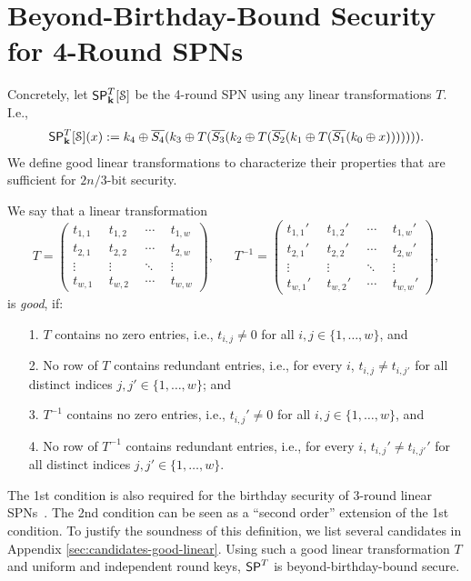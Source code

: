 
\section{Beyond-Birthday-Bound Security for 4-Round SPNs}
\label{section:security of 4-round SPNs}

Concretely, let $\mathsf{SP}_{\mathbf{k}}^T[\mathcal{S}]$ be the 4-round SPN using any linear transformations $T$. I.e.,
%
\begin{align}
\mathsf{SP}_{\mathbf{k}}^T[\mathcal{S}](x):=k_4\oplus\overline{S_4}(k_3\oplus T(\overline{S_3}(k_2\oplus T(\overline{S_2}(k_1\oplus T(\overline{S_1}(k_0\oplus x))))))).
\label{eq:defn-4-round-spn}
\end{align}
%
We define good linear transformations to characterize their properties that are sufficient for $2n/3$-bit security.


\begin{definition}
	\label{defn:good-T}
	
	We say that a linear transformation
	\[
	T=
	\left(
	\begin{array}{cccc}
	t_{1,1}~ & ~t_{1,2}~ & ~\cdots~ & ~t_{1,w}  \\
	t_{2,1}~ & ~t_{2,2}~ & ~\cdots~ & ~t_{2,w}  \\
	\vdots~   & ~\vdots~  &~\ddots~ & ~\vdots   \\
	t_{w,1}~ & ~t_{w,2}~ & ~\cdots~ & ~t_{w,w}  
	\end{array}
	\right),\ \ \ \ \ \ \ 
	T^{-1}=
	\left(
	\begin{array}{cccc}
	t_{1,1}'~ & ~t_{1,2}'~ & ~\cdots~ & ~t_{1,w}'  \\
	t_{2,1}'~ & ~t_{2,2}'~ & ~\cdots~ & ~t_{2,w}'  \\
	\vdots~   & ~\vdots~  &~\ddots~ & ~\vdots   \\
	t_{w,1}'~ & ~t_{w,2}'~ & ~\cdots~ & ~t_{w,w}'  
	\end{array}
	\right),
	\]
	is {\it good}, if:
	\begin{enumerate}
		\item[1.] $T$ contains no zero entries, i.e., $t_{i,j}\neq 0$ for all $i,j\in\{1,\ldots,w\}$, and
		\item[2.] No row of $T$ contains redundant entries, i.e., for every $i$, $t_{i,j}\neq t_{i,j'}$ for all distinct indices $j,j'\in\{1,\ldots,w\}$; and
		\item[3.] $T^{-1}$ contains no zero entries, i.e., $t_{i,j}'\neq 0$ for all $i,j\in\{1,\ldots,w\}$, and
		\item[4.] No row of $T^{-1}$ contains redundant entries, i.e., for every $i$, $t_{i,j}'\neq t_{i,j'}'$ for all distinct indices $j,j'\in\{1,\ldots,w\}$.
	\end{enumerate}
\end{definition}
%
The 1st condition is also required for the birthday security of 3-round linear SPNs~\cite[Sect. 3]{EPRINT:DKSTZ17}. The 2nd condition can be seen as a ``second order'' extension of the 1st condition. To justify the soundness of this definition, we list several candidates in Appendix \ref{sec:candidates-good-linear}. Using such a good linear transformation $T$ and uniform and independent round keys, $\mathsf{SP}^T$ is beyond-birthday-bound secure.

